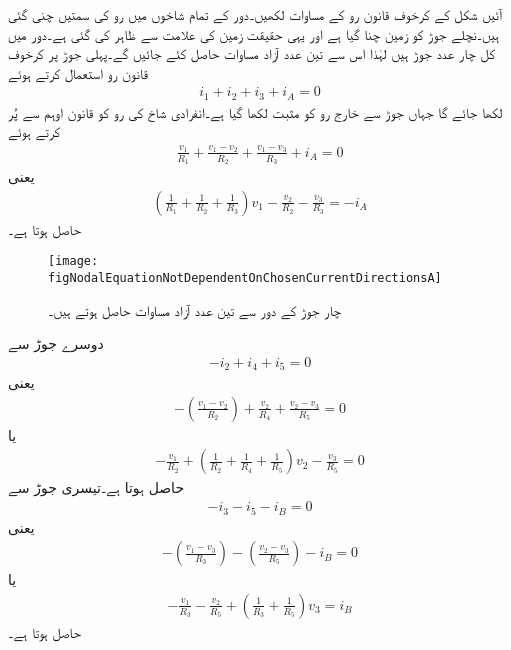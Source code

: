 آئیں شکل  کے کرخوف قانون رو  کے مساوات لکھیں۔دور کے تمام شاخوں میں رو کی سمتیں چنی گئی ہیں۔نچلے جوڑ کو زمین چنا گیا ہے اور یہی حقیقت زمین کی علامت سے ظاہر کی گئی ہے۔دور میں کل چار  عدد جوڑ ہیں لہٰذا اس سے تین  عدد آزاد مساوات حاصل کئے جائیں گے۔پہلی جوڑ پر کرخوف قانون رو استعمال کرتے ہوئے
\begin{align*}
i_1+i_2+i_3+i_A=0
\end{align*}
لکھا جائے گا جہاں جوڑ سے خارج رو کو مثبت لکھا گیا ہے۔انفرادی شاخ کی رو کو قانون اوہم سے پُر کرتے ہوئے
\begin{align*}
\frac{v_1}{R_1}+\frac{v_1-v_2}{R_2}+\frac{v_1-v_3}{R_3}+i_A=0
\end{align*}
یعنی
\begin{align}\label{مساوات_جوڑ_چار_جوڑ_تین_آزاد_الف}
\left(\frac{1}{R_1}+\frac{1}{R_2}+\frac{1}{R_3}\right)v_1-\frac{v_2}{R_2}-\frac{v_3}{R_3}=-i_A
\end{align}
حاصل ہوتا ہے۔
\begin{figure}
\centering
\texttt{[image: figNodalEquationNotDependentOnChosenCurrentDirectionsA]}
\caption{چار جوڑ کے دور سے تین عدد آزاد مساوات حاصل ہوتے ہیں۔}
\label{شکل_جوڑ_چار_جوڑ_تین_آزاد_مساوات_الف}
\end{figure}%
دوسرے جوڑ سے
\begin{align*}
-i_2+i_4+i_5=0
\end{align*}
یعنی
\begin{align*}
-\left(\frac{v_1-v_2}{R_2}\right)+\frac{v_2}{R_4}+\frac{v_2-v_3}{R_5}=0
\end{align*}
یا
\begin{align}\label{مساوات_جوڑ_چار_جوڑ_تین_آزاد_ب}
-\frac{v_1}{R_2}+\left(\frac{1}{R_2}+\frac{1}{R_4}+\frac{1}{R_5}\right)v_2-\frac{v_3}{R_5}=0
\end{align}
حاصل ہوتا ہے۔تیسری جوڑ سے
\begin{align*}
-i_3-i_5-i_B=0
\end{align*}
یعنی
\begin{align*}
-\left(\frac{v_1-v_3}{R_3}\right)-\left(\frac{v_2-v_3}{R_5}\right)-i_B=0
\end{align*}
یا
\begin{align}\label{مساوات_جوڑ_چار_جوڑ_تین_آزاد_پ}
-\frac{v_1}{R_3}-\frac{v_2}{R_5}+\left(\frac{1}{R_3}+\frac{1}{R_5}\right)v_3=i_B
\end{align}
حاصل ہوتا ہے۔

